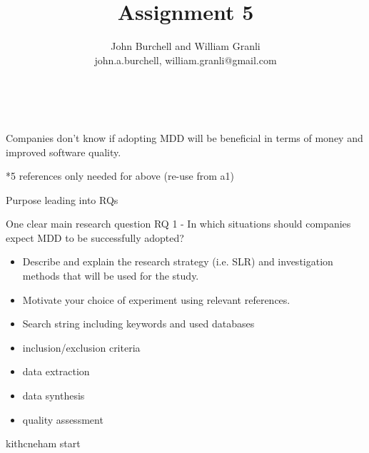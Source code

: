 \documentclass[10pt,twocolumn]{article}
\begin{document}
\title{Assignment 5}

\author{John Burchell and William Granli \\
john.a.burchell, william.granli@gmail.com}


\maketitle
\thispagestyle{empty}




​

Companies don't know if adopting MDD will be beneficial in terms of money and improved software quality.



*5 references only needed for above (re-use from a1)

Purpose leading into RQs

One clear main research question
RQ 1 - In which situations should companies expect MDD to be successfully adopted?



\begin{itemize}
\item Describe and explain the research strategy (i.e. SLR) and investigation methods that will be used for the study. 
\item Motivate your choice of experiment using relevant references. 
\item Search string including keywords and used databases
\item inclusion/exclusion criteria
\item data extraction
\item data synthesis
\item quality assessment
\end{itemize}

kithcneham start
\end{document}
